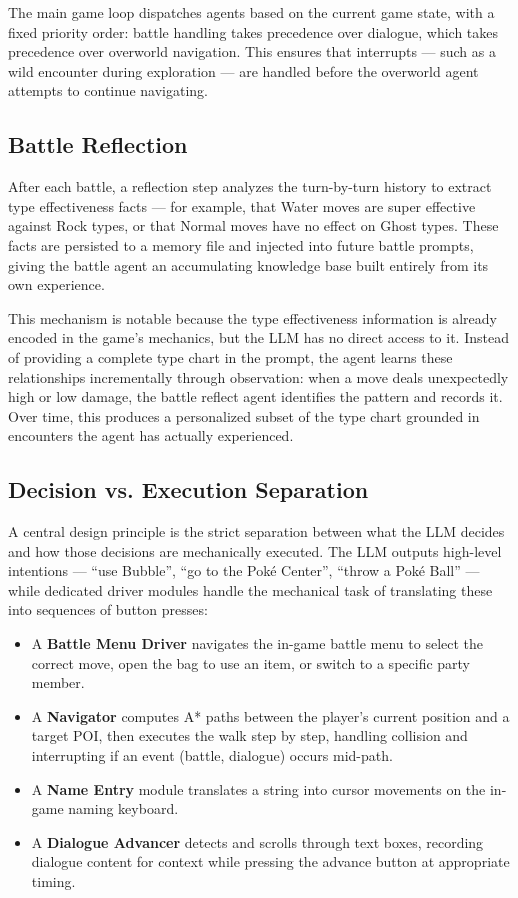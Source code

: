 \documentclass{article}
\begin{document}
The main game loop dispatches agents based on the current game state, with a fixed priority order: battle handling takes precedence over dialogue, which takes precedence over overworld navigation. This ensures that interrupts --- such as a wild encounter during exploration --- are handled before the overworld agent attempts to continue navigating.

\subsection{Battle Reflection}
\label{sec:reflection}

After each battle, a reflection step analyzes the turn-by-turn history to extract type effectiveness facts --- for example, that Water moves are super effective against Rock types, or that Normal moves have no effect on Ghost types. These facts are persisted to a memory file and injected into future battle prompts, giving the battle agent an accumulating knowledge base built entirely from its own experience.

This mechanism is notable because the type effectiveness information is already encoded in the game's mechanics, but the LLM has no direct access to it. Instead of providing a complete type chart in the prompt, the agent learns these relationships incrementally through observation: when a move deals unexpectedly high or low damage, the battle reflect agent identifies the pattern and records it. Over time, this produces a personalized subset of the type chart grounded in encounters the agent has actually experienced.

\subsection{Decision vs. Execution Separation}

A central design principle is the strict separation between what the LLM decides and how those decisions are mechanically executed. The LLM outputs high-level intentions --- ``use Bubble'', ``go to the Pok\'{e} Center'', ``throw a Pok\'{e} Ball'' --- while dedicated driver modules handle the mechanical task of translating these into sequences of button presses:

\begin{itemize}
  \item A \textbf{Battle Menu Driver} navigates the in-game battle menu to select the correct move, open the bag to use an item, or switch to a specific party member.
  \item A \textbf{Navigator} computes A* paths between the player's current position and a target POI, then executes the walk step by step, handling collision and interrupting if an event (battle, dialogue) occurs mid-path.
  \item A \textbf{Name Entry} module translates a string into cursor movements on the in-game naming keyboard.
  \item A \textbf{Dialogue Advancer} detects and scrolls through text boxes, recording dialogue content for context while pressing the advance button at appropriate timing.
\end{itemize}
\end{document}
